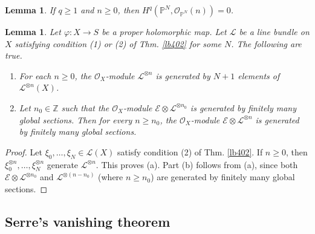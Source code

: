\documentclass[12pt,b5paper,notitlepage]{report}
\theoremstyle{definition}
\theoremstyle{plain}
\newtheorem{lm}[df]{Lemma}
\newcommand{\scr}{\mathscr}
\newcommand{\Zbb}{\mathbb Z}
\newcommand{\Pbb}{\mathbb P}
\numberwithin{equation}{section}
\begin{document}
\begin{lm}\label{lb410}
If $q\geq 1$ and $n\geq 0$, then $H^q(\Pbb^N,\scr O_{\Pbb^N}(n))=0$.
\end{lm}


\begin{lm}\label{lb406}
Let $\varphi:X\rightarrow S$ be a proper holomorphic map.  Let $\scr L$ be a line bundle on $X$ satisfying condition (1) or (2) of Thm. \ref{lb402} for some $N$. The following are true.
\begin{enumerate}[label=(\alph*)]
\item For each $n\geq 0$, the $\scr O_X$-module $\scr L^{\otimes n}$ is generated by $N+1$ elements of $\scr L^{\otimes n}(X)$.
\item Let $n_0\in\Zbb$ such that the $\scr O_X$-module $\scr E\otimes\scr L^{\otimes n_0}$ is generated by finitely many global sections. Then for every $n\geq n_0$, the $\scr O_X$-module $\scr E\otimes\scr L^{\otimes n}$ is generated by finitely many global sections.
\end{enumerate}
\end{lm}

\begin{proof}
Let $\xi_0,\dots,\xi_N\in\scr L(X)$ satisfy condition (2) of Thm. \ref{lb402}. If $n\geq0$, then $\xi_0^{\otimes n},\dots,\xi_N^{\otimes n}$ generate $\scr L^{\otimes n}$. This proves (a). Part (b) follows from (a), since both $\scr E\otimes\scr L^{\otimes n_0}$ and $\scr L^{\otimes (n-n_0)}$ (where $n\geq n_0$) are generated by finitely many global sections. 
\end{proof}




\subsection{Serre's vanishing theorem}
\end{document}
